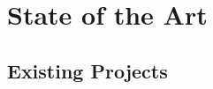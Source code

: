 
\chapter{State of the Art}
\label{cha:state-of-the-art}

\section{Existing Projects}
\label{sec:existing-projects}